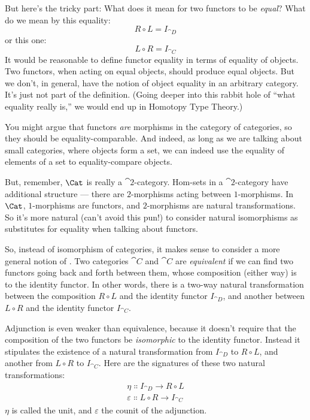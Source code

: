 \noindent
But here's the tricky part: What does it mean for two functors to be
\emph{equal}? What do we mean by this equality:
\[R \circ L = I_{\cat{D}}\]
or this one:
\[L \circ R = I_{\cat{C}}\]
It would be reasonable to define functor equality in terms of equality
of objects. Two functors, when acting on equal objects, should produce
equal objects. But we don't, in general, have the notion of object
equality in an arbitrary category. It's just not part of the definition.
(Going deeper into this rabbit hole of ``what equality really is,'' we
would end up in Homotopy Type Theory.)

You might argue that functors \emph{are} morphisms in the category of
categories, so they should be equality-comparable. And indeed, as long
as we are talking about small categories, where objects form a set, we
can indeed use the equality of elements of a set to equality-compare
objects.

But, remember, $\Cat$ is really a $\cat{2}$-category. Hom-sets in a
$\cat{2}$-category have additional structure --- there are $2$-morphisms acting
between $1$-morphisms. In $\Cat$, $1$-morphisms are functors, and
$2$-morphisms are natural transformations. So it's more natural (can't
avoid this pun!) to consider natural isomorphisms as substitutes for
equality when talking about functors.

So, instead of isomorphism of categories, it makes sense to consider a
more general notion of . Two categories $\cat{C}$ and
$\cat{C}$ are \emph{equivalent} if we can find two functors going back
and forth between them, whose composition (either way) is
 to the identity functor. In other words,
there is a two-way natural transformation between the composition
$R \circ L$ and the identity functor $I_{\cat{D}}$, and another
between $L \circ R$ and the identity functor $I_{\cat{C}}$.

Adjunction is even weaker than equivalence, because it doesn't require
that the composition of the two functors be \emph{isomorphic} to the
identity functor. Instead it stipulates the existence of a  natural transformation from $I_{\cat{D}}$ to $R \circ L$, and
another from $L \circ R$ to $I_{\cat{C}}$. Here are the signatures of
these two natural transformations:
\begin{gather*}
\eta \Colon I_{\cat{D}} \to R \circ L \\
\varepsilon \Colon L \circ R \to I_{\cat{C}}
\end{gather*}
$\eta$ is called the unit, and $\varepsilon$ the counit of the adjunction.

